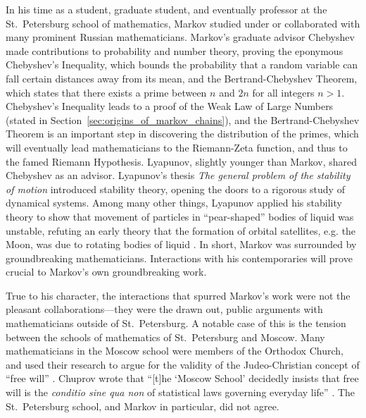 \documentclass[12pt]{article}
\theoremstyle{definition}
\begin{document}

In his time as a student, graduate student, and eventually professor at the
St.~Petersburg school of mathematics, Markov studied under or collaborated with
many prominent Russian mathematicians. Markov's graduate advisor Chebyshev made
contributions to probability and number theory, proving the eponymous
Chebyshev's Inequality, which bounds the probability that a random variable can
fall certain distances away from its mean, and the Bertrand-Chebyshev Theorem,
which states that there exists a prime between $n$ and $2n$ for all integers $n
> 1$. Chebyshev's Inequality leads to a proof of the Weak Law of Large Numbers
(stated in Section~\ref{sec:origins_of_markov_chains}), and the
Bertrand-Chebyshev Theorem is an important step in discovering the distribution
of the primes, which will eventually lead mathematicians to the Riemann-Zeta
function, and thus to the famed Riemann Hypothesis. Lyapunov, slightly younger
than Markov, shared Chebyshev as an advisor. Lyapunov's thesis \emph{The
general problem of the stability of motion} introduced stability theory,
opening the doors to a rigorous study of dynamical systems. Among many other
things, Lyapunov applied his stability theory to show that movement of
particles in ``pear-shaped'' bodies of liquid was unstable, refuting an early
theory that the formation of orbital satellites, e.g. the Moon, was due to
rotating bodies of liquid \citep[pg.~276]{parks1992lyapunov}. In short, Markov
was surrounded by groundbreaking mathematicians. Interactions with his
contemporaries will prove crucial to Markov's own groundbreaking work.

True to his character, the interactions that spurred Markov's work were not the
pleasant collaborations---they were the drawn out, public arguments with
mathematicians outside of St.~Petersburg. A notable case of this is the tension
between the schools of mathematics of St.~Petersburg and Moscow. Many
mathematicians in the Moscow school were members of the Orthodox Church, and
used their research to argue for the validity of the Judeo-Christian concept of
``free will'' \citep[p.~255]{seneta1996markov}. Chuprov wrote that ``[t]he
`Moscow School' decidedly insists that free will is the \emph{conditio sine qua
non} of statistical laws governing everyday life''
\citep[p.~257]{seneta1996markov}. The St.~Petersburg school, and Markov in
particular, did not agree.
\end{document}
